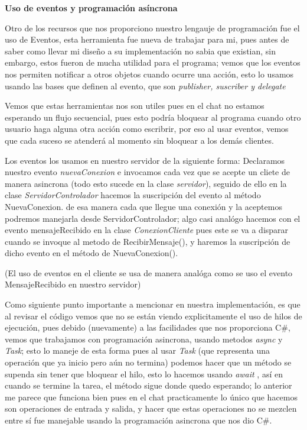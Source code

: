 \documentclass[10pt,letterpaper]{report}
\begin{document}
    \vspace{0.3cm}

    \noindent \textbf{Uso de eventos y programación asíncrona}
    
    \noindent Otro de los recursos que nos proporciono nuestro lengauje de programación fue el uso de Eventos, esta herramienta fue nueva de trabajar para mi, pues antes de saber como llevar mi diseño a su implementación no sabia que existian, sin embargo, estos fueron de mucha utilidad para el programa; vemos que los eventos nos permiten notificar a otros objetos cuando ocurre una acción, esto lo usamos usando las bases que definen al evento, que son \textit{publisher, suscriber y delegate}
    
    \vspace{0.2 cm}

    \noindent Vemos que estas herramientas nos son utiles pues en el chat no estamos esperando un flujo secuencial, pues esto podría bloquear al programa cuando otro usuario haga alguna otra acción como escribrir, por eso al usar eventos, vemos que cada suceso se atenderá al momento sin bloquear a los demás clientes.


    \vspace{0.2 cm}
    
    \noindent Los eventos los usamos en nuestro servidor de la siguiente forma:
    Declaramos nuestro evento \textit{nuevaConexion} e invocamos cada vez que se acepte un cliete de manera asincrona (todo esto sucede en la clase \textit{servidor}), seguido de ello en la clase \textit{ServidorControlador} hacemos la suscripción del evento al método NuevaConexion. de esa manera cada que llegue una conexión y la aceptemos podremos manejarla desde ServidorControlador; algo casi analógo hacemos con el evento mensajeRecibido en la clase \textit{ConexionCliente} pues este se va a disparar cuando se invoque al metodo de RecibirMensaje(), y haremos la suscripción de dicho evento en el método de NuevaConexion().

    \noindent(El uso de eventos en el cliente se usa de manera analóga como se uso el evento MensajeRecibido en nuestro servidor)

    \vspace{0.2cm}

    \noindent Como siguiente punto importante a mencionar en nuestra implementación, es que al revisar el código vemos que no se están viendo explicitamente el uso de hilos de ejecución, pues debido (nuevamente) a las facilidades que nos proporciona C\#, vemos que trabajamos con programación asincrona, usando metodos \textit{async} y \textit{Task}; esto lo maneje de esta forma pues al usar \textit{Task} (que representa una operación que ya inicio pero aún no termina) podemos hacer que un método se supenda sin tener que bloquear el hilo, esto lo hacemos usando \textit{await} , así en cuando se termine la tarea, el método sigue donde quedo esperando; lo anterior me parece que funciona bien pues en el chat practicamente lo único que hacemos son operaciones de entrada y salida, y hacer que estas operaciones no se mezclen entre sí fue manejable usando la programación asincrona que nos dio C\#.
\end{document}
